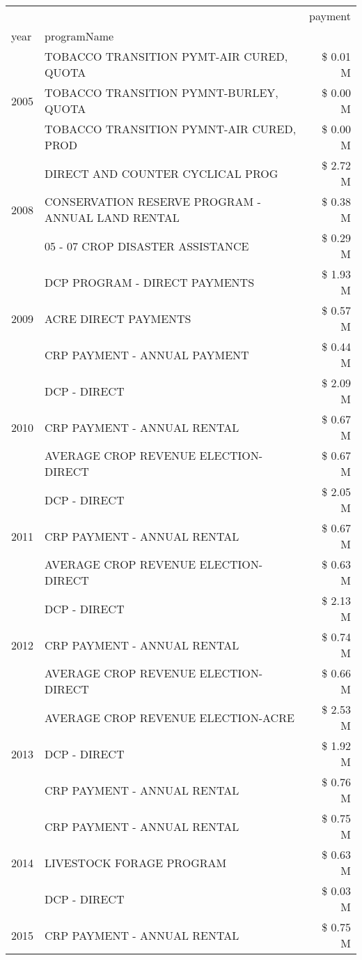 \begin{tabular}{llr}
\toprule
 &  & payment \\
year & programName &  \\
\midrule
\multirow[t]{3}{*}{2005} & TOBACCO TRANSITION PYMT-AIR CURED, QUOTA & \$ 0.01 M \\
 & TOBACCO TRANSITION PYMNT-BURLEY, QUOTA & \$ 0.00 M \\
 & TOBACCO TRANSITION PYMNT-AIR CURED, PROD & \$ 0.00 M \\
\cline{1-3}
\multirow[t]{3}{*}{2008} & DIRECT AND COUNTER CYCLICAL PROG & \$ 2.72 M \\
 & CONSERVATION RESERVE PROGRAM - ANNUAL LAND RENTAL & \$ 0.38 M \\
 & 05 - 07 CROP DISASTER ASSISTANCE & \$ 0.29 M \\
\cline{1-3}
\multirow[t]{3}{*}{2009} & DCP PROGRAM - DIRECT PAYMENTS & \$ 1.93 M \\
 & ACRE DIRECT PAYMENTS & \$ 0.57 M \\
 & CRP PAYMENT - ANNUAL PAYMENT & \$ 0.44 M \\
\cline{1-3}
\multirow[t]{3}{*}{2010} & DCP - DIRECT & \$ 2.09 M \\
 & CRP PAYMENT - ANNUAL RENTAL & \$ 0.67 M \\
 & AVERAGE CROP REVENUE ELECTION-DIRECT & \$ 0.67 M \\
\cline{1-3}
\multirow[t]{3}{*}{2011} & DCP - DIRECT & \$ 2.05 M \\
 & CRP PAYMENT - ANNUAL RENTAL & \$ 0.67 M \\
 & AVERAGE CROP REVENUE ELECTION-DIRECT & \$ 0.63 M \\
\cline{1-3}
\multirow[t]{3}{*}{2012} & DCP - DIRECT & \$ 2.13 M \\
 & CRP PAYMENT - ANNUAL RENTAL & \$ 0.74 M \\
 & AVERAGE CROP REVENUE ELECTION-DIRECT & \$ 0.66 M \\
\cline{1-3}
\multirow[t]{3}{*}{2013} & AVERAGE CROP REVENUE ELECTION-ACRE & \$ 2.53 M \\
 & DCP - DIRECT & \$ 1.92 M \\
 & CRP PAYMENT - ANNUAL RENTAL & \$ 0.76 M \\
\cline{1-3}
\multirow[t]{3}{*}{2014} & CRP PAYMENT - ANNUAL RENTAL & \$ 0.75 M \\
 & LIVESTOCK FORAGE PROGRAM & \$ 0.63 M \\
 & DCP - DIRECT & \$ 0.03 M \\
\cline{1-3}
\multirow[t]{3}{*}{2015} & CRP PAYMENT - ANNUAL RENTAL & \$ 0.75 M \\

\end{tabular}
